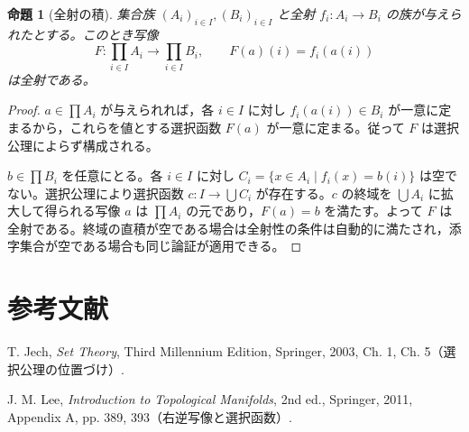 \documentclass[a5paper,10pt,dvipdfmx]{jsarticle}
\theoremstyle{definition}
\theoremstyle{plain}
\newtheorem{prop}[ruledef]{命題}
\begin{document}
\begin{prop}[全射の積]\label{k67}
集合族 $(A_i)_{i\in I},(B_i)_{i\in I}$ と全射 $f_i:A_i\to B_i$ の族が与えられたとする。このとき写像
\[
 F:\prod_{i\in I}A_i\longrightarrow\prod_{i\in I}B_i,
 \qquad F(a)(i)=f_i(a(i))
\]
は全射である。
\end{prop}
\begin{proof}
$a\in\prod A_i$ が与えられれば，各 $i\in I$ に対し $f_i(a(i))\in B_i$ が一意に定まるから，これらを値とする選択函数 $F(a)$ が一意に定まる。従って $F$ は選択公理によらず構成される。

$b\in\prod B_i$ を任意にとる。各 $i\in I$ に対し $C_i=\{x\in A_i\mid f_i(x)=b(i)\}$ は空でない。選択公理により選択函数 $c:I\to\bigcup C_i$ が存在する。$c$ の終域を $\bigcup A_i$ に拡大して得られる写像 $a$ は $\prod A_i$ の元であり，$F(a)=b$ を満たす。よって $F$ は全射である。終域の直積が空である場合は全射性の条件は自動的に満たされ，添字集合が空である場合も同じ論証が適用できる。
\end{proof}
\section*{参考文献}
\noindent T. Jech, \textit{Set Theory}, Third Millennium Edition, Springer, 2003, Ch. 1, Ch. 5（選択公理の位置づけ）.\par
\noindent J. M. Lee, \textit{Introduction to Topological Manifolds}, 2nd ed., Springer, 2011, Appendix A, pp. 389, 393（右逆写像と選択函数）.
\end{document}
